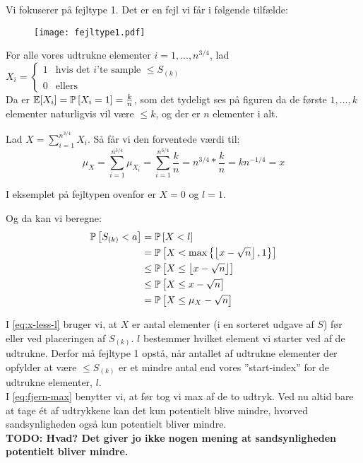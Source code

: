Vi fokuserer på fejltype 1. Det er en fejl vi får i følgende tilfælde:
\begin{figure}[H]
  \begin{center}
  \texttt{[image: fejltype1.pdf]}
  \end{center}
  \label{fig:fejltype1}
\end{figure}




For alle vores udtrukne elementer $i = 1, ..., n^{3/4}$, lad
$
X_i =
\begin{cases}
	1 & \text{hvis det $i$'te sample $\leq S_{(k)}$}\\
	0 & \text{ellers}
\end{cases}
$\\

Da er ${\mathbb E}[X_i] = \mathbb{P} \left[  X_i = 1  \right] = \frac{k}{n}$, som det tydeligt ses på figuren da de første $1, ..., k$ elementer naturligvis vil være $\leq k$, og der er $n$ elementer i alt.

Lad $X = \sum_{i=1}^{n^{3/4}} X_i$. Så får vi den forventede værdi til:
$$
\mu_X = \sum_{i=1}^{n^{3/4}} \mu_{X_i} = \sum_{i=1}^{n^{3/4}} \frac{k}{n} = n^{3/4} * \frac{k}{n} = kn^{-1/4} = x
$$

I eksemplet på fejltypen ovenfor er $X = 0$ og $l = 1$.

Og da kan vi beregne:
\begin{align}
  \mathbb{P} \left[  S_{(k)} < a  \right] &= \mathbb{P} \left[  X < l  \right] \label{eq:x-less-l}  \\
  &= \mathbb{P} \left[  X < \max \left\{ \left\lfloor x - \sqrt{n} \right\rfloor, 1 \right\}   \right] \nonumber\\
  &\leq \mathbb{P} \left[  X \leq \left\lfloor x - \sqrt{n} \right\rfloor  \right] \label{eq:fjern-max} \\
  &\leq \mathbb{P} \left[  X \leq x - \sqrt{n}  \right] \nonumber\\
  &= \mathbb{P} \left[  X \leq \mu_X - \sqrt{n}  \right] \label{eq:p-simpel}
\end{align}

I \cref{eq:x-less-l} bruger vi, at $X$ er antal elementer (i en sorteret udgave af $S$) før eller ved placeringen af $S_{(k)}$. $l$ bestemmer hvilket element vi starter ved af de udtrukne. Derfor må fejltype 1 opstå, når antallet af udtrukne elementer der opfylder at være $\leq S_{(k)}$ er et mindre antal end vores ''start-index'' for de udtrukne elementer, $l$.\\
I \cref{eq:fjern-max} benytter vi, at før tog vi max af de to udtryk. Ved nu altid bare at tage ét af udtrykkene kan det kun potentielt blive mindre, hvorved sandsynligheden også kun potentielt bliver mindre.\\
\textbf{TODO: Hvad? Det giver jo ikke nogen mening at sandsynligheden potentielt bliver mindre.}\\

